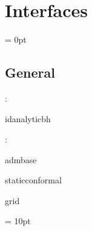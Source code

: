 
\section{Interfaces} 


\parskip = 0pt

\vspace{3mm} \subsection*{General}

: 

idanalyticbh
\vspace{2mm}

: 

admbase

staticconformal

grid
\vspace{2mm}

\vspace{5mm}\parskip = 10pt 
